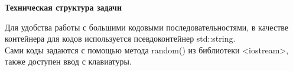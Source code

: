 \documentclass{article}
\begin{document}
   		
   		 
   		\begin{center}
   			\large \textbf {Техническая структура задачи}
   		\end{center}
   	
   		Для удобства работы с большими кодовыми последовательностями, в качестве контейнера для кодов используется псевдоконтейнер std::string.\\	 
   		Сами коды задаются с помощью метода random() из библиотеки <iostream>, также доступен ввод с клавиатуры.  
   		 
   		 
   		 
   		 
        
        
\end{document}
